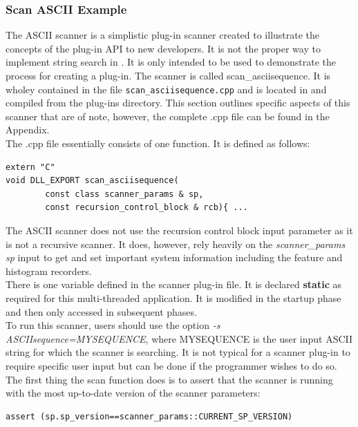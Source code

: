 \documentclass[11pt,fleqn]{article} %
\begin{document}
\subsubsection{Scan ASCII Example}
\label{scanasciisequence}
The ASCII scanner is a simplistic plug-in scanner created to illustrate the concepts of the plug-in API to new developers. It is not the proper way to implement string search in \bulk. It is only intended to be used to demonstrate the process for creating a plug-in. The scanner is called scan\_asciisequence. It is wholey contained in the file \texttt{scan\_asciisequence.cpp} and is located in and compiled from the plug-ins directory. This section outlines specific aspects of this scanner that are of note, however, the complete .cpp file can be found in the Appendix.\\

The .cpp file essentially consists of one function. It is defined as follows: 
\begin{lstlisting}
extern "C"
void DLL_EXPORT scan_asciisequence(
		const class scanner_params & sp,
		const recursion_control_block & rcb){ ...
\end{lstlisting}

The ASCII scanner does not use the recursion control block input parameter as it is not a recursive scanner. It does, however, rely heavily on the \textit{scanner\_params sp} input to get and set important system information including the feature and histogram recorders. \\

There is one variable defined in the scanner plug-in file. It is declared \textbf{static} as required for this multi-threaded application. It is modified in the startup phase and then only accessed in subsequent phases. \\

To run this scanner, \bulk users should use the option \textit{-s ASCIIsequence=MYSEQUENCE}, where MYSEQUENCE is the user input ASCII string for which the scanner is searching. It is not typical for a scanner plug-in to require specific user input but can be done if the programmer wishes to do so.\\

The first thing the scan function does is to assert that the scanner is running with the most up-to-date version of the scanner parameters:
\begin{lstlisting}
assert (sp.sp_version==scanner_params::CURRENT_SP_VERSION)
\end{lstlisting}
 
\end{document}
